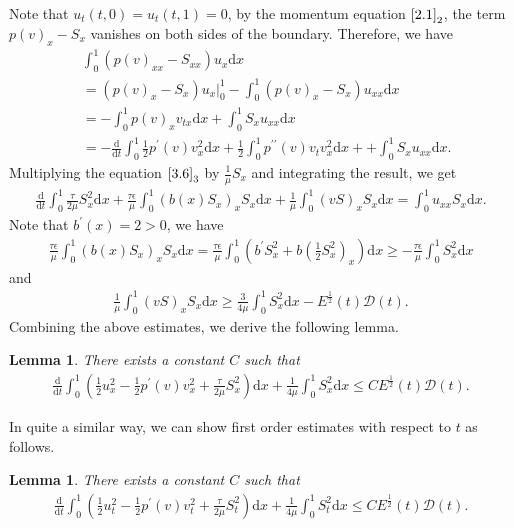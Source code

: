 \documentclass[10pt,reqno]{amsart}
\numberwithin{equation}{section}
\newtheorem{lemma}[theorem]{Lemma}
\newcommand{\dif}{\mathrm{d}}
\begin{document}
Note that $u_t(t,0)=u_t(t,1)=0$, by the momentum equation $\eqref{2.1}_2$, the term $p(v)_x-S_x$ vanishes on both sides of the boundary. Therefore, we have
\begin{align*} 
&\int_0^1 (p(v)_{xx}-S_{xx})u_x\dif x \\
&=(p(v)_x-S_x)u_x\big|_0^1-\int_0^1 (p(v)_x-S_x)u_{xx} \dif x\\
&=-\int_0^1 p(v)_x v_{tx}\dif x+\int_0^1 S_x u_{xx}\dif x\\
&=-\frac{\dif}{\dif t} \int_0^1 \frac{1}{2}p^\prime(v) v_x^2 \dif x+\frac{1}{2}\int_0^1 p^{\prime\prime}(v)v_t  v_x^2\dif x++\int_0^1 S_x u_{xx}\dif x.
\end{align*}
Multiplying the  equation  $\eqref{3.6}_3$ by $\frac{1}{\mu}S_x$ and integrating the result, we get
\begin{align*}
\frac{\dif}{\dif t} \int_0^1\frac{\tau}{2\mu} S_x^2\dif x+\frac{\tau\epsilon}{\mu} \int_0^1 (b(x)S_x)_x S_x\dif x+\frac{1}{\mu}\int_0^1 (vS)_x S_x \dif x =\int_0^1 u_{xx}S_x\dif x.
\end{align*}
Note that $b^\prime(x)=2>0$, we have
\begin{align*}
\frac{\tau\epsilon}{\mu} \int_0^1 (b(x)S_x)_x S_x\dif x
=\frac{\tau\epsilon}{\mu} \int_0^1 \left( b^\prime S_x^2+b\left(\frac{1}{2} S_x^2 \right)_x\right)\dif x
\ge -\frac{\tau\epsilon}{\mu} \int_0^1 S_x^2 \dif x
\end{align*}
and
\begin{align*}
\frac{1}{\mu} \int_0^1 (vS)_x S_x \dif x \ge \frac{3}{4\mu} \int_0^1 S_x^2 \dif x -E^\frac{1}{2}(t) \mathcal D(t).
\end{align*}
Combining the above estimates, we derive the following lemma.
\begin{lemma}\label{Le3.3}
There exists a constant $C$ such that
\begin{align}\label{3.7}
\frac{\dif}{\dif t} \int_0^1 \left( \frac{1}{2} u_x^2-\frac{1}{2}p^\prime(v) v_x^2+\frac{\tau}{2\mu} S_x^2 \right)\dif x +\frac{1}{4\mu}\int_0^1 S_x^2 \dif x 
\le C E^\frac{1}{2}(t) \mathcal D(t).
\end{align}
\end{lemma}
In quite a similar way, we can show first order estimates with respect to $t$ as follows.
\begin{lemma}\label{Le3.4}
There exists  a constant $C$ such that
\begin{align}\label{3.8}
\frac{\dif}{\dif t} \int_0^1 \left( \frac{1}{2} u_t^2-\frac{1}{2}p^\prime(v) v_t^2+\frac{\tau}{2\mu} S_t^2 \right)\dif x +\frac{1}{4\mu}\int_0^1 S_t^2 \dif x 
\le C E^\frac{1}{2}(t) \mathcal D(t) .
\end{align}
\end{lemma}
\end{document}
